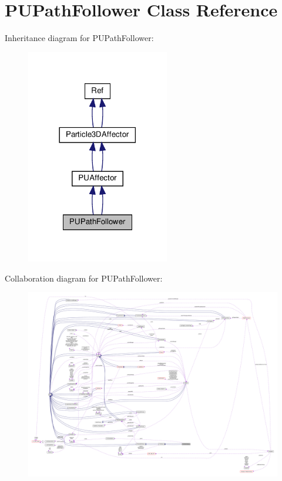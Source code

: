\hypertarget{classPUPathFollower}{}\section{P\+U\+Path\+Follower Class Reference}
\label{classPUPathFollower}


Inheritance diagram for P\+U\+Path\+Follower\+:
\nopagebreak
\begin{figure}[H]
\begin{center}
\leavevmode
\includegraphics[width=177pt]{classPUPathFollower__inherit__graph}
\end{center}
\end{figure}


Collaboration diagram for P\+U\+Path\+Follower\+:
\nopagebreak
\begin{figure}[H]
\begin{center}
\leavevmode
\includegraphics[width=350pt]{classPUPathFollower__coll__graph}
\end{center}
\end{figure}
